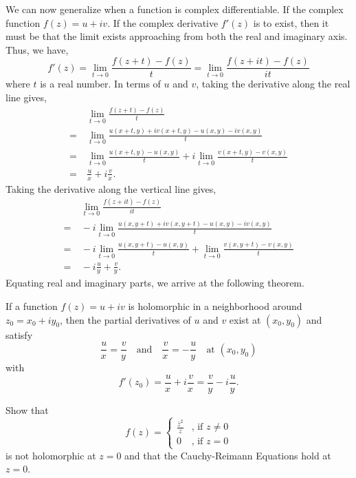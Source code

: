 \documentclass[11pt]{article}
\newcommand*{\pd}[3][]{\ensuremath{\frac{^{#1} #2}{ #3^{#1}}}}
\begin{document}
We can now generalize when a function is complex differentiable. If the complex
function $f(z) = u + iv$. If the complex derivative $f'(z)$ is to exist, then it
must be that the limit exists approaching from both the real and imaginary
axis. Thus, we have,
\begin{equation*}
	f'(z)  = \lim_{t\to 0} \frac{f(z+t) - f(z)}{t} = \lim_{t\to 0} \frac{f(z+it)
	- f(z)}{it}
\end{equation*}
where $t$ is a real number. In terms of $u$ and $v$, taking the derivative along
the real line gives,
\begin{align*}
	&\>\lim_{t\to 0} \frac{f(z+t) - f(z)}{t}\\
	=&\> \lim_{t\to 0} \frac{u(x+t,y) + iv(x+t,y) - u(x,y) - iv(x,y)}{t}\\
	=&\> \lim_{t\to 0} \frac{u(x+t,y) - u(x,y)}{t} + i\lim_{t\to 0}
	\frac{v(x+t,y) - v(x,y)}{t}\\
	=&\> \pd{u}{x} + i \pd{v}{x}.
\end{align*}
Taking the derivative along the vertical line gives,
\begin{align*}
	&\>\lim_{t\to 0} \frac{f(z+it) - f(z)}{it}\\
	=&\> -i\lim_{t\to 0} \frac{u(x,y+t) + iv(x,y+t) - u(x,y) - iv(x,y)}{t}\\
	=&\> -i\lim_{t\to 0} \frac{u(x,y+t) - u(x,y)}{t} + \lim_{t\to 0}
	\frac{v(x,y+t) - v(x,y)}{t}\\
	=&\> -i\pd{u}{y} + \pd{v}{y}.
\end{align*}
Equating real and imaginary parts, we arrive at the following theorem.
\begin{theorem} \label{theorem1}
	If a function $f(z) = u + iv$ is holomorphic in a neighborhood around $z_0 =
	x_0 + iy_0$, then the partial derivatives of $u$ and $v$ exist at
	$(x_0,y_0)$ and satisfy
	\begin{equation*}
		\pd{u}{x} = \pd{v}{y} \quad \text{and} \quad \pd{v}{x} = -
		\pd{u}{y}\quad\text{at } (x_0,y_0)
	\end{equation*}
	with
	\begin{equation*}
		f'(z_0) = \pd{u}{x} + i \pd{v}{x} = \pd{v}{y} - i\pd{u}{y}.
	\end{equation*}
\end{theorem}
\begin{example}
	Show that
	\begin{equation*}
		f(z) =
		\begin{cases}
			\frac{\bar z^2}{z} & \text{, if } z \neq 0\\
			0 & \text{, if } z = 0
		\end{cases}
	\end{equation*}
	is not holomorphic at $z = 0$ and that the Cauchy-Reimann Equations hold at
	$z = 0$.
\end{example}
\end{document}
